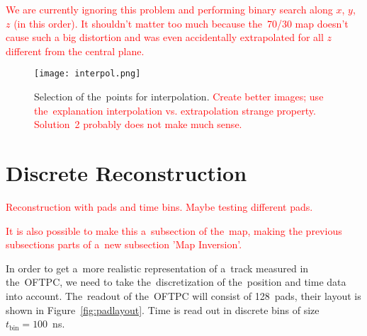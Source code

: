 			\textcolor{red}{We are currently ignoring this problem and performing binary search along $x$, $y$, $z$ (in this order). It shouldn't matter too much because the~70/30 map doesn't cause such a big distortion and was even accidentally extrapolated for all $z$ different from the central plane.}
			
			\begin{figure}[H]
				\centering
				\texttt{[image: interpol.png]}
				\caption{Selection of the~points for interpolation. \textcolor{red}{Create better images; use the~explanation interpolation vs. extrapolation strange property. Solution~2 probably does not make much sense.}}
				\label{fig:interpol}
			\end{figure}
		
	\section{Discrete Reconstruction}
		\textcolor{red}{Reconstruction with pads and time bins. Maybe testing different pads.}
		
		\textcolor{red}{It is also possible to make this a~subsection of the~map, making the previous subsections parts of a~new subsection 'Map Inversion'.}
		
		In order to get a~more realistic representation of a~track measured in the~\ac{OFTPC}, we need to take the~discretization of the~position and time data into account. The~readout of the~\ac{OFTPC} will consist of 128~pads, their layout is shown in Figure~\ref{fig:padlayout}. Time is read out in discrete bins of size $t_\text{bin} = 100$~ns.
		
